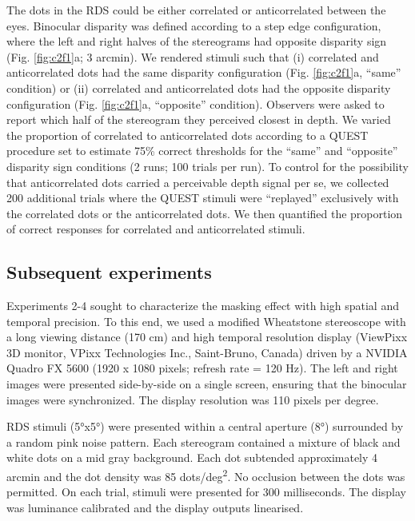 The dots in the RDS could be either correlated or anticorrelated between the eyes. Binocular disparity was defined according to a step edge configuration, where the left and right halves of the stereograms had opposite disparity sign (Fig. \ref{fig:c2f1}a;  3 arcmin). We rendered stimuli such that (i) correlated and anticorrelated dots had the same disparity configuration (Fig. \ref{fig:c2f1}a, ``same'' condition) or (ii) correlated and anticorrelated dots had the opposite disparity configuration (Fig. \ref{fig:c2f1}a, ``opposite'' condition). Observers were asked to report which half of the stereogram they perceived closest in depth. We varied the proportion of correlated to anticorrelated dots according to a QUEST procedure \cite{Watson:1983aa} set to estimate 75\% correct thresholds for the ``same'' and ``opposite'' disparity sign conditions (2 runs; 100 trials per run).
To control for the possibility that anticorrelated dots carried a perceivable depth signal per se, we collected 200 additional trials where the QUEST stimuli were ``replayed'' exclusively with the correlated dots or the anticorrelated dots. We then quantified the proportion of correct responses for correlated and anticorrelated stimuli. 

\subsection{Subsequent experiments}
Experiments 2-4 sought to characterize the masking effect with high spatial and temporal precision. To this end, we used a modified Wheatstone stereoscope with a long viewing distance (170 cm) and high temporal resolution display (ViewPixx 3D monitor, VPixx Technologies Inc., Saint-Bruno, Canada) driven by a NVIDIA Quadro FX 5600 (1920 x 1080 pixels; refresh rate = 120 Hz). The left and right images were presented side-by-side on a single screen, ensuring that the binocular images were synchronized. The display resolution was 110 pixels per degree.

RDS stimuli (\ang{5}x\ang{5}) were presented within a central aperture (\ang{8}) surrounded by a random pink noise pattern. Each stereogram contained a mixture of black and white dots on a mid gray background. Each dot subtended approximately 4 arcmin and the dot density was 85 dots/deg\textsuperscript{2}. No occlusion between the dots was permitted. On each trial, stimuli were presented for 300 milliseconds. The display was luminance calibrated and the display outputs linearised.

